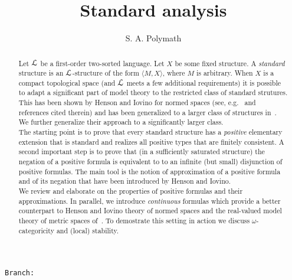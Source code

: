 \documentclass{amsproc}
\author{S. A. Polymath}
\newcommand\branch{}
\begin{document}
\title{Standard analysis}
\hfill\texttt{Branch:\ \branch\ \DTMnow}\bigskip
\maketitle
\raggedbottom

\begin{abstract}
  Let ${\EuScript L}$ be a first-order two-sorted language.
  Let $X$ be some fixed structure.
  A \textit{standard\/} structure is an ${\EuScript L}$-structure of the form $\langle M,X\rangle$, where $M$ is arbitrary.
  When $X$ is a compact topological space (and ${\EuScript L}$ meets a few additional requirements) it is possible to adapt a significant part of model theory to the restricted class of standard strutures.
  This has been shown by Henson and Iovino for normed spaces (see, e.g.~\cite{HI} and references cited therein) and has been generalized to a larger class of structures in~\cite{clcl}.
  We further generalize their approach to a significantly larger class.\\[1ex]
  \noindent
  The starting point is to prove that every standard structure has a \textit{positive\/} elementary extension that is standard and realizes all positive types that are finitely consistent.
  A second important step is to prove that (in a sufficiently saturated structure) the negation of a positive formula is equivalent to to an infinite (but small) disjunction of positive formulas.
  The main tool is the notion of approximation of a positive formula and of its negation that have been introduced by Henson and Iovino.\\[1ex]
  \noindent
  We review and elaborate on the properties of positive formulas and their approximations.
  In parallel, we introduce \textit{continuous\/} formulas which provide a better counterpart to Henson and Iovino theory of normed spaces and the real-valued model theory of metric spaces of~\cite{BBHU}.
  To demostrate this setting in action we discuss $\omega$-categoricity and (local) stability.
\end{abstract}

\end{document}
